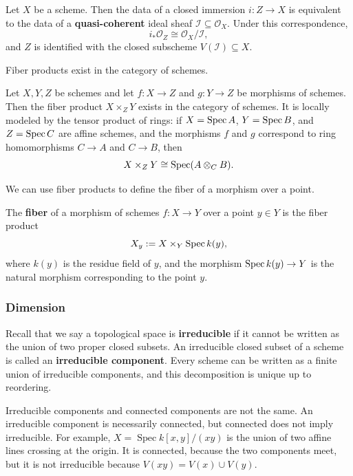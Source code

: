 \documentclass[12pt]{article}
\begin{document}
\begin{proposition}
    Let \(X\) be a scheme. Then the data of a closed immersion \(i:Z\to X\) is equivalent to the data of a \textbf{quasi-coherent} ideal sheaf \(\mathcal I\subseteq \mathcal O_X\). Under this correspondence,
    \[
        i_*\mathcal O_Z \cong \mathcal O_X/\mathcal I,
    \]
    and \(Z\) is identified with the closed subscheme \(V(\mathcal I)\subseteq X\).
\end{proposition}

Fiber products exist in the category of schemes.

\begin{theorem}
    Let \(X,Y,Z\) be schemes and let \(f:X\to Z\) and \(g:Y\to Z\) be morphisms of schemes. Then the fiber product \(X\times_Z Y\) exists in the category of schemes. It is locally modeled by the tensor product of rings: if \(X=\operatorname{Spec} A\), \(Y=\operatorname{Spec} B\), and \(Z=\operatorname{Spec} C\) are affine schemes, and the morphisms \(f\) and \(g\) correspond to ring homomorphisms \(C \to A\) and \(C \to B\), then
    \[
        X\times_Z Y \cong \operatorname{Spec} (A\otimes_C B).
    \]
\end{theorem}

We can use fiber products to define the fiber of a morphism over a point.
\begin{definition}
    The \textbf{fiber} of a morphism of schemes \(f:X\to Y\) over a point \(y\in Y\) is the fiber product
    \[
        X_y := X \times_Y \operatorname{Spec} k(y),
    \]
    where \(k(y)\) is the residue field of \(y\), and the morphism \(\operatorname{Spec} k(y) \to Y\) is the natural morphism corresponding to the point \(y\).
\end{definition}

\subsubsection{Dimension}
Recall that we say a topological space is \textbf{irreducible} if it cannot be written as the union of two proper closed subsets. An irreducible closed subset of a scheme is called an \textbf{irreducible component}. Every scheme can be written as a finite union of irreducible components, and this decomposition is unique up to reordering.

\begin{remark}
    Irreducible components and connected components are not the same. An irreducible component is necessarily connected, but connected does not imply irreducible. For example, $X=\operatorname{Spec} k[x,y]/(xy)$ is the union of two affine lines crossing at the origin. It is connected, because the two components meet, but it is not irreducible because $V(xy)=V(x)\cup V(y)$.
\end{remark}
\end{document}

